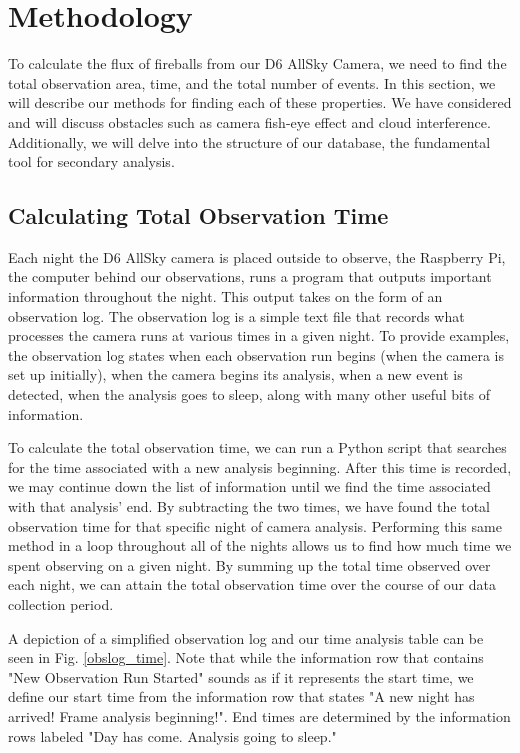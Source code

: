 

\chapter{Methodology}

To calculate the flux of fireballs from our D6 AllSky Camera, we need to find the total observation area, time, and the total number of events.
In this section, we will describe our methods for finding each of these properties.
We have considered and will discuss obstacles such as camera fish-eye effect and cloud interference.  
Additionally, we will delve into the structure of our database, the fundamental tool for secondary analysis.

\section{Calculating Total Observation Time}

Each night the D6 AllSky camera is placed outside to observe, the Raspberry Pi, the computer behind our observations, runs a program that outputs important information throughout the night.
This output takes on the form of an observation log. 
The observation log is a simple text file that records what processes the camera runs at various times in a given night.
To provide examples, the observation log states when each observation run begins (when the camera is set up initially), when the camera begins its analysis, when a new event is detected, when the analysis goes to sleep, along with many other useful bits of information.

To calculate the total observation time, we can run a Python script that searches for the time associated with a new analysis beginning.  
After this time is recorded, we may continue down the list of information until we find the time associated with that analysis' end.  
By subtracting the two times, we have found the total observation time for that specific night of camera analysis.  
Performing this same method in a loop throughout all of the nights allows us to find how much time we spent observing on a given night. 
By summing up the total time observed over each night, we can attain the total observation time over the course of our data collection period.

A depiction of a simplified observation log and our time analysis table can be seen in Fig. \ref{obslog_time}.
Note that while the information row that contains "New Observation Run Started" sounds as if it represents the start time, we define our start time from the information row that states "A new night has arrived! Frame analysis beginning!".
End times are determined by the information rows labeled "Day has come.  Analysis going to sleep."

